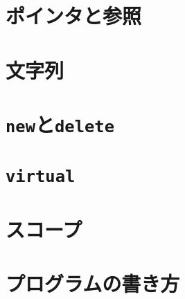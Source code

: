 \section{ポインタと参照}
\label{sec:ポインタと参照}

\section{文字列}

\section{\texttt{new}と\texttt{delete}}
\label{sec:newとdelete}

\section{\texttt{virtual}}
\label{subsec:virtual}

\section{スコープ}
\label{sec:スコープ}

\section{プログラムの書き方}
